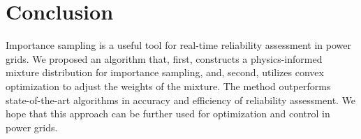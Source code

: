 \section{Conclusion}\label{sampling:conclusion}

Importance sampling is a useful tool for real-time reliability assessment in power grids. We proposed an algorithm that, first, constructs a physics-informed mixture distribution for importance sampling, and, second, utilizes convex optimization to adjust the weights of the mixture.  The method outperforms state-of-the-art algorithms in accuracy and efficiency of reliability assessment. We hope that this approach can be further used for optimization and control in power grids. %


